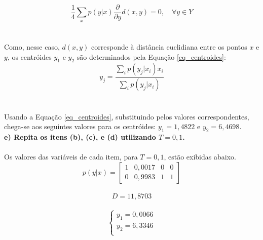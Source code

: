 \documentclass{report}
\begin{document}
\begin{equation}
\frac{1}{4} \sum_x p(y|x) \frac{\partial}{\partial y} d(x,y) = 0, \quad \forall y \in Y
\end{equation}\\

\paragraph{} Como, nesse caso, $d(x,y)$ corresponde à distância euclidiana entre os pontos $x$ e $y$, os centróides $y_1$ e $y_2$ são determinados pela Equação \eqref{eq_centroides}:\\

\begin{equation}\label{eq_centroides}
	y_j = \frac{\sum_i p(y_j|x_i)x_i}{\sum_i p(y_j|x_i)}
\end{equation}\\

\paragraph{} Usando a Equação \eqref{eq_centroides}, substituindo pelos valores correspondentes, chega-se aos seguintes valores para os centróides: $y_1 = 1,4822$ e $y_2 = 6,4698$.\\

\textbf{e) Repita os itens (b), (c), e (d) utilizando $T = 0,1$.}\\

\paragraph{} Os valores das variáveis de cada item, para $T = 0,1$, estão exibidas abaixo.\\

\begin{equation*}
p(y|x) = \left[\begin{array}{cccc}
1 & 0,0017 & 0 & 0 \\ 
0 & 0,9983 & 1 & 1
\end{array} \right]
\end{equation*}\\

\begin{equation*}
D = 11,8703
\end{equation*}\\

\begin{equation*}
\begin{cases}
	y_1 = 0,0066\\
	y_2 = 6,3346\\
\end{cases}
\end{equation*}
\end{document}
